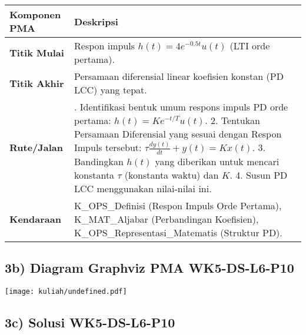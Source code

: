 \documentclass[
  letterpaper,
  DIV=11,
  numbers=noendperiod]{scrreprt}
\begin{document}
\begin{longtable}[]{@{}
  >{\raggedright\arraybackslash}p{}
  >{\raggedright\arraybackslash}p{}@{}}
\toprule\noalign{}
\begin{minipage}[b]{\linewidth}\raggedright
Komponen PMA
\end{minipage} & \begin{minipage}[b]{\linewidth}\raggedright
Deskripsi
\end{minipage} \\
\midrule\noalign{}
\endhead
\bottomrule\noalign{}
\endlastfoot
\textbf{Titik Mulai} & Respon impuls \(h(t) = 4e^{-0.5t} u(t)\) (LTI
orde pertama). \\
\textbf{Titik Akhir} & Persamaan diferensial linear koefisien konstan
(PD LCC) yang tepat. \\
\textbf{Rute/Jalan} & 1. Identifikasi bentuk umum respons impuls PD orde
pertama: \(h(t) = K e^{-t/T} u(t)\). 2. Tentukan Persamaan Diferensial
yang sesuai dengan Respon Impuls tersebut:
\(\tau \frac{dy(t)}{dt} + y(t) = K x(t)\). 3. Bandingkan \(h(t)\) yang
diberikan untuk mencari konstanta \(\tau\) (konstanta waktu) dan \(K\).
4. Susun PD LCC menggunakan nilai-nilai ini. \\
\textbf{Kendaraan} & K\_OPS\_Definisi (Respon Impuls Orde Pertama),
K\_MAT\_Aljabar (Perbandingan Koefisien),
K\_OPS\_Representasi\_Matematis (Struktur PD). \\
\end{longtable}

\subsection{3b) Diagram Graphviz PMA
WK5-DS-L6-P10}\label{b-diagram-graphviz-pma-wk5-ds-l6-p10}

\texttt{[image: kuliah/undefined.pdf]}

\subsection{3c) Solusi WK5-DS-L6-P10}\label{c-solusi-wk5-ds-l6-p10}
\end{document}
